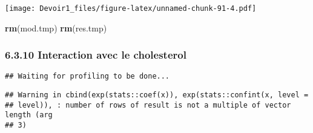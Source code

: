 \documentclass[]{article}
\newenvironment{Shaded}{\begin{snugshade}}{\end{snugshade}}
\newcommand{\KeywordTok}[1]{\textcolor[rgb]{0.13,0.29,0.53}{\textbf{#1}}}
\newcommand{\DataTypeTok}[1]{\textcolor[rgb]{0.13,0.29,0.53}{#1}}
\newcommand{\DecValTok}[1]{\textcolor[rgb]{0.00,0.00,0.81}{#1}}
\newcommand{\StringTok}[1]{\textcolor[rgb]{0.31,0.60,0.02}{#1}}
\newcommand{\OperatorTok}[1]{\textcolor[rgb]{0.81,0.36,0.00}{\textbf{#1}}}
\newcommand{\NormalTok}[1]{#1}
\begin{document}
\texttt{[image: Devoir1\_files/figure-latex/unnamed-chunk-91-4.pdf]}

\begin{Shaded}
\begin{Highlighting}[]
\KeywordTok{rm}\NormalTok{(mod.tmp)}
\KeywordTok{rm}\NormalTok{(res.tmp)}
\end{Highlighting}
\end{Shaded}

\subsubsection{6.3.10 Interaction avec le
cholesterol}\label{interaction-avec-le-cholesterol}

\begin{Shaded}
\end{Shaded}

\begin{verbatim}
## Waiting for profiling to be done...
\end{verbatim}

\begin{verbatim}
## Warning in cbind(exp(stats::coef(x)), exp(stats::confint(x, level =
## level)), : number of rows of result is not a multiple of vector length (arg
## 3)
\end{verbatim}
\end{document}
